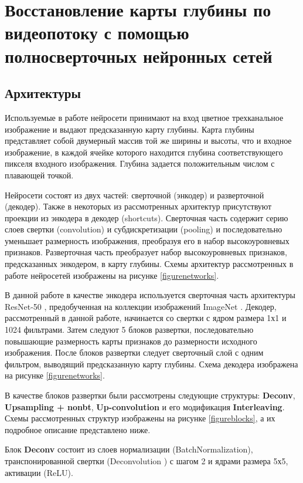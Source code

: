 \documentclass{mipt-thesis-bs}
\begin{document}
\chapter{Восстановление карты глубины по видеопотоку с помощью полносверточных нейронных сетей}

\section{Архитектуры}
\label{section_arch}

Используемые в работе нейросети принимают на вход цветное трехканальное изображение и выдают предсказанную карту глубины. Карта глубины представляет собой двумерный массив той же ширины и высоты, что и входное изображение, в каждой ячейке которого находится глубина соответствующего пикселя входного изображения. Глубина задается положительным числом с плавающей точкой.

Нейросети состоят из двух частей: сверточной (энкодер) и разверточной (декодер). Также в некоторых из рассмотренных архитектур присутствуют проекции из энкодера в декодер (shortcuts). Сверточная часть содержит серию слоев свертки (convolution) и субдискретизации (pooling) и  последовательно уменьшает размерность изображения, преобразуя его в набор высокоуровневых признаков. Разверточная часть преобразует набор высокоуровневых признаков, предсказанных энкодером, в карту глубины. Схемы архитектур рассмотренных в работе нейросетей изображены на рисунке \ref{figurenetworks}.

В данной работе в качестве энкодера используется сверточная часть архитектуры ResNet-50 \cite{he2016deep}, предобученная на коллекции изображений ImageNet \cite{deng2009imagenet}. Декодер, рассмотренный в данной работе, начинается со свертки с ядром размера 1х1 и 1024 фильтрами. Затем следуют 5 блоков развертки, последовательно повышающие размерность карты признаков до размерности исходного изображения. После блоков развертки следует сверточный слой с одним фильтром, выводящий предсказанную карту глубины. Схема декодера изображена на рисунке \ref{figurenetworks}.

В качестве блоков развертки были рассмотрены следующие структуры: \textbf{Deconv}, \textbf{Upsampling + nonbt}, \textbf{Up-convolution} и его модификация \textbf{Interleaving}. Схемы рассмотренных структур изображены на рисунке \ref{figureblocks}, а их подробное описание представлено ниже.

Блок \textbf{Deconv} состоит из слоев нормализации (BatchNormalization), транспонированной свертки (Deconvolution \cite{zeiler2010deconvolutional}) с шагом 2 и ядрами размера 5х5, активации (ReLU).
\end{document}
